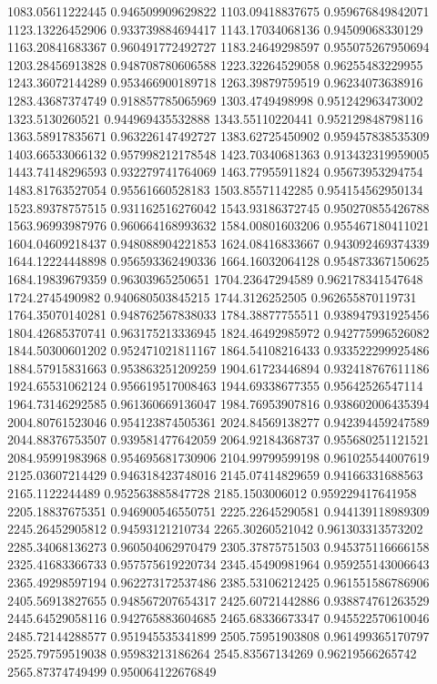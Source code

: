 {1083.05611222445 0.946509909629822
1103.09418837675 0.959676849842071
1123.13226452906 0.933739884694417
1143.17034068136 0.94509068330129
1163.20841683367 0.960491772492727
1183.24649298597 0.955075267950694
1203.28456913828 0.948708780606588
1223.32264529058 0.96255483229955
1243.36072144289 0.953466900189718
1263.39879759519 0.96234073638916
1283.43687374749 0.918857785065969
1303.4749498998 0.951242963473002
1323.5130260521 0.944969435532888
1343.55110220441 0.952129848798116
1363.58917835671 0.963226147492727
1383.62725450902 0.959457838535309
1403.66533066132 0.957998212178548
1423.70340681363 0.913432319959005
1443.74148296593 0.932279741764069
1463.77955911824 0.95673953294754
1483.81763527054 0.95561660528183
1503.85571142285 0.954154562950134
1523.89378757515 0.931162516276042
1543.93186372745 0.950270855426788
1563.96993987976 0.960664168993632
1584.00801603206 0.955467180411021
1604.04609218437 0.948088904221853
1624.08416833667 0.943092469374339
1644.12224448898 0.956593362490336
1664.16032064128 0.954873367150625
1684.19839679359 0.96303965250651
1704.23647294589 0.962178341547648
1724.2745490982 0.940680503845215
1744.3126252505 0.962655870119731
1764.35070140281 0.948762567838033
1784.38877755511 0.938947931925456
1804.42685370741 0.963175213336945
1824.46492985972 0.942775996526082
1844.50300601202 0.952471021811167
1864.54108216433 0.933522299925486
1884.57915831663 0.953863251209259
1904.61723446894 0.932418767611186
1924.65531062124 0.956619517008463
1944.69338677355 0.95642526547114
1964.73146292585 0.961360669136047
1984.76953907816 0.938602006435394
2004.80761523046 0.954123874505361
2024.84569138277 0.942394459247589
2044.88376753507 0.939581477642059
2064.92184368737 0.955680251121521
2084.95991983968 0.954695681730906
2104.99799599198 0.961025544007619
2125.03607214429 0.946318423748016
2145.07414829659 0.94166331688563
2165.1122244489 0.952563885847728
2185.1503006012 0.959229417641958
2205.18837675351 0.946900546550751
2225.22645290581 0.944139118989309
2245.26452905812 0.94593121210734
2265.30260521042 0.961303313573202
2285.34068136273 0.960504062970479
2305.37875751503 0.945375116666158
2325.41683366733 0.957575619220734
2345.45490981964 0.959255143006643
2365.49298597194 0.962273172537486
2385.53106212425 0.961551586786906
2405.56913827655 0.948567207654317
2425.60721442886 0.938874761263529
2445.64529058116 0.942765883604685
2465.68336673347 0.945522570610046
2485.72144288577 0.951945535341899
2505.75951903808 0.961499365170797
2525.79759519038 0.95983213186264
2545.83567134269 0.96219566265742
2565.87374749499 0.950064122676849
}
